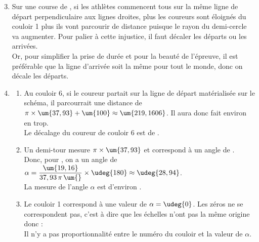 {\begin{corrige}
   \begin{enumerate}
     \setcounter{enumi}{2}
      \item Sur une course de , si les athlètes commencent tous sur la même ligne de départ perpendiculaire aux lignes droites, plus les coureurs sont éloignés du couloir 1 plus ils vont parcourir de distance puisque le rayon du demi-cercle va augmenter. Pour palier à cette injustice, il faut décaler les départs ou les arrivées. \\
         Or, pour simplifier la prise de durée et pour la beauté de l'épreuve, il est préférable que la ligne d'arrivée soit la même pour tout le monde, donc on décale les départs.
      \item 
         \begin{enumerate}
            \item Au couloir 6, si le coureur partait sur la ligne de départ matérialisée sur le schéma, il parcourrait une distance de $\pi\times\um{37,93}+\um{100}  \approx\um{219,1606}$. Il aura donc fait environ  en trop. \\
               {\blue Le décalage du coureur de couloir 6 est de }.
            \item Un demi-tour mesure $\pi\times\um{37,93}$ et correspond à un angle de . \\ [1mm]
               Donc, pour , on a un angle de $\alpha =\dfrac{\um{19,16}}{37,93\,\pi\,\um{}}\times\udeg{180} \approx\udeg{28,94}$. \\ [1mm]
               {\blue La mesure de l'angle $\alpha$ est d'environ }.
            \item Le couloir 1 correspond à une valeur de $\alpha =\udeg{0}$. Les \og zéros \fg{} ne se correspondent pas, c'est à dire que les échelles n'ont pas la même origine donc : \\
               {\blue Il n'y a pas proportionnalité entre le numéro du couloir et la valeur de $\alpha$.}
         \end{enumerate}
   \end{enumerate}
\end{corrige}

\bigskip


}
